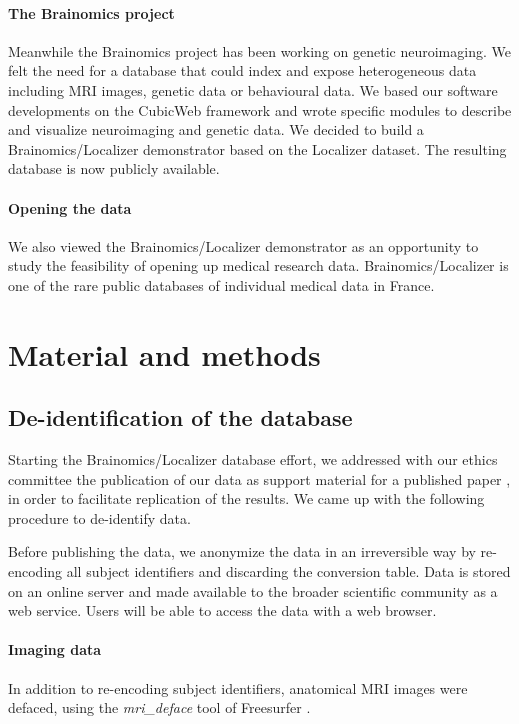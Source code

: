 \documentclass[review]{elsarticle}
\begin{document}
\paragraph{The Brainomics project} Meanwhile the Brainomics project has been working on genetic neuroimaging. We felt the need for a database that could index and expose heterogeneous data including MRI images, genetic data or behavioural data. We based our software developments on the CubicWeb framework and wrote specific modules to describe and visualize neuroimaging and genetic data. We decided to build a Brainomics/Localizer demonstrator based on the Localizer dataset. The resulting database is now publicly available.

\paragraph{Opening the data} We also viewed the Brainomics/Localizer demonstrator
as an opportunity  to study the feasibility of opening up medical research data.
Brainomics/Localizer is one of the rare public databases of individual medical
data in France.


\section{Material and methods}

\subsection{De-identification of the database}

Starting the Brainomics/Localizer database effort, we addressed with our ethics
committee the publication of our data as support material for a published
paper \cite{Pinel2012}, in order to facilitate replication of the results. We came
up with the following procedure to de-identify data.

Before publishing the data, we anonymize the data in an irreversible way by
re-encoding all subject identifiers and discarding the conversion table. Data
is stored on an online server and made available to the broader scientific
community as a web service. Users will be able to access the data with a web
browser.

\paragraph{Imaging data} In addition to re-encoding subject identifiers,
anatomical MRI images were defaced, using the \textit{mri\_deface} tool of
Freesurfer \cite{Fischl2012}.
\end{document}
